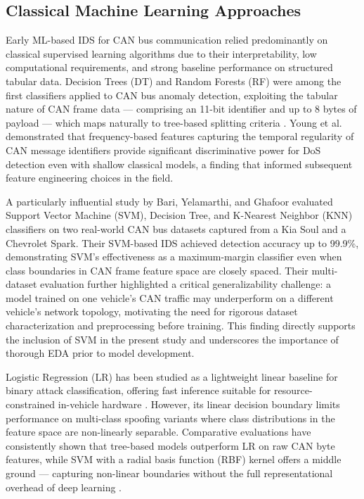 \documentclass[conference]{IEEEtran}
\begin{document}
\subsection{Classical Machine Learning Approaches}

Early ML-based IDS for CAN bus communication relied predominantly on classical supervised learning algorithms due to their interpretability, low computational requirements, and strong baseline performance on structured tabular data. Decision Trees (DT) and Random Forests (RF) were among the first classifiers applied to CAN bus anomaly detection, exploiting the tabular nature of CAN frame data — comprising an 11-bit identifier and up to 8 bytes of payload — which maps naturally to tree-based splitting criteria \cite{young2019canidssurvey}. Young et al. \cite{young2019canidssurvey} demonstrated that frequency-based features capturing the temporal regularity of CAN message identifiers provide significant discriminative power for DoS detection even with shallow classical models, a finding that informed subsequent feature engineering choices in the field.

A particularly influential study by Bari, Yelamarthi, and Ghafoor \cite{fi18010042} evaluated Support Vector Machine (SVM), Decision Tree, and K-Nearest Neighbor (KNN) classifiers on two real-world CAN bus datasets captured from a Kia Soul and a Chevrolet Spark. Their SVM-based IDS achieved detection accuracy up to 99.9\%, demonstrating SVM's effectiveness as a maximum-margin classifier even when class boundaries in CAN frame feature space are closely spaced. Their multi-dataset evaluation further highlighted a critical generalizability challenge: a model trained on one vehicle's CAN traffic may underperform on a different vehicle's network topology, motivating the need for rigorous dataset characterization and preprocessing before training. This finding directly supports the inclusion of SVM in the present study and underscores the importance of thorough EDA prior to model development.

Logistic Regression (LR) has been studied as a lightweight linear baseline for binary attack classification, offering fast inference suitable for resource-constrained in-vehicle hardware \cite{8642311}. However, its linear decision boundary limits performance on multi-class spoofing variants where class distributions in the feature space are non-linearly separable. Comparative evaluations have consistently shown that tree-based models outperform LR on raw CAN byte features, while SVM with a radial basis function (RBF) kernel offers a middle ground — capturing non-linear boundaries without the full representational overhead of deep learning \cite{fi18010042}.
\end{document}
